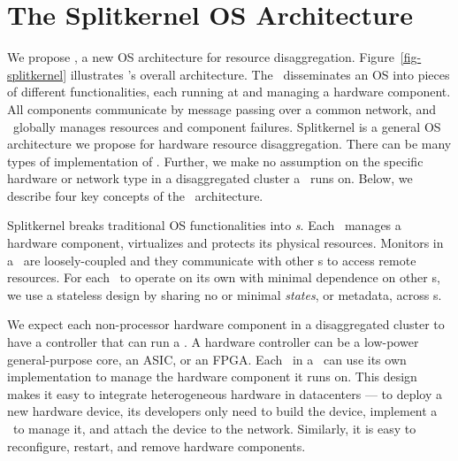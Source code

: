 \section{The Splitkernel OS Architecture}
\label{sec:lego:design}

We propose {\em \splitkernel}, a new OS architecture for resource disaggregation. 
Figure~\ref{fig-splitkernel} illustrates \splitkernel's overall architecture.
The \splitkernel\ disseminates an OS into pieces of different functionalities,
each running at and managing a hardware component.
All components communicate by message passing over a common network,
and \splitkernel\ globally manages resources and component failures.
Splitkernel is a general OS architecture we propose for hardware resource disaggregation.
There can be many types of implementation of \splitkernel.
Further, we make no assumption on the specific hardware or network type in a disaggregated cluster a \splitkernel\ runs on.
Below, we describe four key concepts of the \splitkernel\ architecture.

Splitkernel breaks traditional OS functionalities into {\em \microos{}s}.
Each \microos\ manages a hardware component, virtualizes and protects its physical resources.
Monitors in a \splitkernel\ are loosely-coupled and 
they communicate with other \microos{}s to access remote resources. 
For each \microos\ to operate on its own with minimal dependence on other \microos{}s,
we use a stateless design by sharing no or minimal {\em states}, or metadata,
across \microos{}s.

We expect each non-processor hardware component in a disaggregated cluster to have a controller that 
can run a \microos.
A hardware controller can be a low-power general-purpose core, an ASIC, or an FPGA.
Each \microos\ in a \splitkernel\ can use its own implementation to manage the hardware component it runs on.
This design makes it easy to integrate heterogeneous hardware in datacenters ---
to deploy a new hardware device, its developers only need to build the device,
implement a \microos\ to manage it, %
and attach the device to the network. 
Similarly, it is easy to reconfigure, restart, and remove hardware components.

